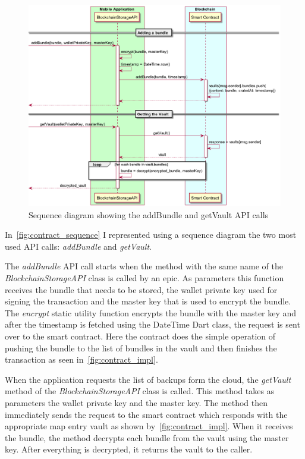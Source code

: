 \documentclass[a4paper,12pt]{report}
\begin{document}
\begin{figure}[H]
    \centering
    \includegraphics[scale=0.272]{diagrams/sequence/contract.png}
    \caption{Sequence diagram showing the addBundle and getVault API calls}\label{fig:contract_sequence}
\end{figure}

In~\autoref{fig:contract_sequence} I represented using a sequence diagram the
two most used API calls: \textit{addBundle} and \textit{getVault}.

The \textit{addBundle} API call starts when the method with the same name of
the \textit{BlockchainStorageAPI} class is called by an epic. As parameters
this function receives the bundle that needs to be stored, the wallet private
key used for signing the transaction and the master key that is used to encrypt
the bundle. The \textit{encrypt} static utility function encrypts the bundle
with the master key and after the timestamp is fetched using the DateTime Dart
class, the request is sent over to the smart contract. Here the contract does
the simple operation of pushing the bundle to the list of bundles in the vault
and then finishes the transaction as seen in~\autoref{fig:contract_impl}.

When the application requests the list of backups form the cloud, the
\textit{getVault} method of the \textit{BlockchainStorageAPI} class is called.
This method takes as parameters the wallet private key and the master key. The
method then immediately sends the request to the smart contract which responds
with the appropriate map entry vault as shown by~\autoref{fig:contract_impl}.
When it receives the bundle, the method decrypts each bundle from the vault
using the master key. After everything is decrypted, it returns the vault to
the caller.
\end{document}
